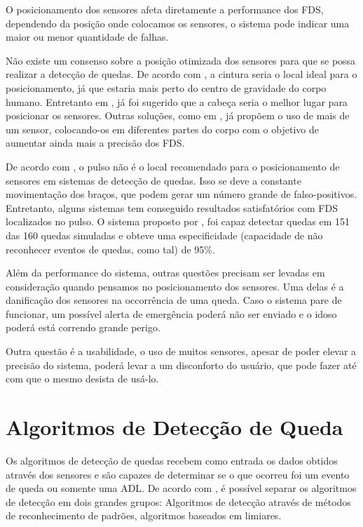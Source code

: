 O posicionamento dos sensores afeta diretamente a performance dos \ac{FDS}, dependendo da posição onde colocamos os sensores, o sistema pode indicar uma maior ou menor quantidade de falhas. 

Não existe um consenso sobre a posição otimizada dos sensores para que se possa realizar a detecção de quedas. De acordo com \cite{abbate2011recognition}, a cintura seria o local ideal para o posicionamento, já que estaria mais perto do centro de gravidade do corpo humano. Entretanto em \cite{kangas2007determination}, já foi sugerido que a cabeça seria o melhor lugar para posicionar os sensores. Outras soluções, como em \cite{gjoreski2011accelerometer}, já propõem o uso de mais de um sensor, colocando-os em diferentes partes do corpo com o objetivo de aumentar ainda mais a precisão dos \ac{FDS}.


De acordo com \cite{casilari2015analysis}, o pulso não é o local recomendado para o posicionamento de sensores em sistemas de detecção de quedas. Isso se deve a constante movimentação dos braços, que podem gerar um número grande de falso-positivos. Entretanto, alguns sistemas tem conseguido resultados satisfatórios com \ac{FDS} localizados no pulso. O sistema proposto por \cite{hsieh2014wrist}, foi capaz detectar quedas em 151 das 160 quedas simuladas e obteve uma especificidade (capacidade de não reconhecer eventos de quedas, como tal) de 95\%.

Além da performance do sistema, outras questões precisam ser levadas em consideração quando pensamos no posicionamento dos sensores. Uma delas é a danificação dos sensores na occorrência de uma queda. Caso o sistema pare de funcionar, um possível alerta de emergência poderá não ser enviado e o idoso poderá está correndo grande perigo. 

Outra questão é a usabilidade, o uso de muitos sensores, apesar de poder elevar a precisão do sistema, poderá levar a um disconforto do usuário, que pode fazer até com que o mesmo desista de usá-lo. 


\section{Algoritmos de Detecção de Queda}
\label{sec: FDS_algorithm}
Os algoritmos de detecção de quedas recebem como entrada os dados obtidos através dos sensores e são capazes de determinar se o que ocorreu foi um evento de queda ou somente uma \ac{ADL}. De acordo com \cite{casilari2015analysis}, é possível separar os algoritmos de detecção em dois grandes grupos: Algoritmos de detecção através de métodos de reconhecimento de padrões, algoritmos baseados em limiares. 




